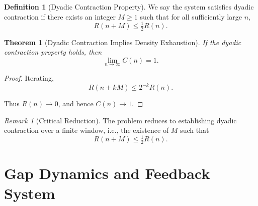 \documentclass[12pt, oneside]{article}
\numberwithin{equation}{section}
\theoremstyle{definition}
\newtheorem{definition}{Definition}[section]
\theoremstyle{plain}
\newtheorem{theorem}{Theorem}[section]
\theoremstyle{remark}
\newtheorem*{remark}{Remark}
\begin{document}
\begin{definition}[Dyadic Contraction Property]
We say the system satisfies dyadic contraction if there exists
an integer $M \ge 1$ such that for all sufficiently large $n$,
\[
R(n+M) \le \tfrac{1}{2} R(n).
\]
\end{definition}





\begin{theorem}[Dyadic Contraction Implies Density Exhaustion]
\label{thm:dyadic-exhaustion}
If the dyadic contraction property holds, then
\[
\lim_{n \to \infty} C(n) = 1.
\]
\end{theorem}

\begin{proof}
Iterating,
\[
R(n + kM) \le 2^{-k} R(n).
\]

Thus $R(n) \to 0$, and hence $C(n) \to 1$.
\end{proof}


\begin{remark}[Critical Reduction]
The problem reduces to establishing dyadic contraction over a finite window,
i.e., the existence of $M$ such that
\[
R(n+M) \le \tfrac{1}{2} R(n).
\]
\end{remark}

\section{Gap Dynamics and Feedback System}
\label{sec:8a-feedback}
\end{document}
